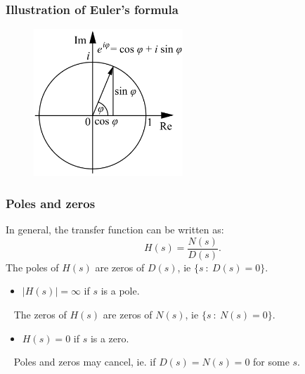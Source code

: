 \begin{frame}
\frametitle{Illustration of Euler's formula}
\begin{figure}
\centering
\includegraphics[width=0.5\textwidth]{euler.png}
\end{figure}
\end{frame}

\begin{frame}
\frametitle{Poles and zeros}
In general, the transfer function can be written as:
\begin{equation*}
H(s) = \frac{N(s)}{D(s)}.
\end{equation*}
\pause
The poles of $H(s)$ are zeros of $D(s)$, ie $\{s\ :\ D(s) = 0\}$.\\
\begin{itemize}
\item $|H(s)|=\infty$ if $s$ is a pole.
\end{itemize}
\ \newline
\pause
The zeros of $H(s)$ are zeros of $N(s)$, ie $\{s\ :\ N(s) = 0\}$. \\
\begin{itemize}
\item $H(s)=0$ if $s$ is a zero.
\end{itemize}
\pause
\ \newline
Poles and zeros may cancel, ie. if $D(s)=N(s)=0$ for some $s$.
\end{frame}

